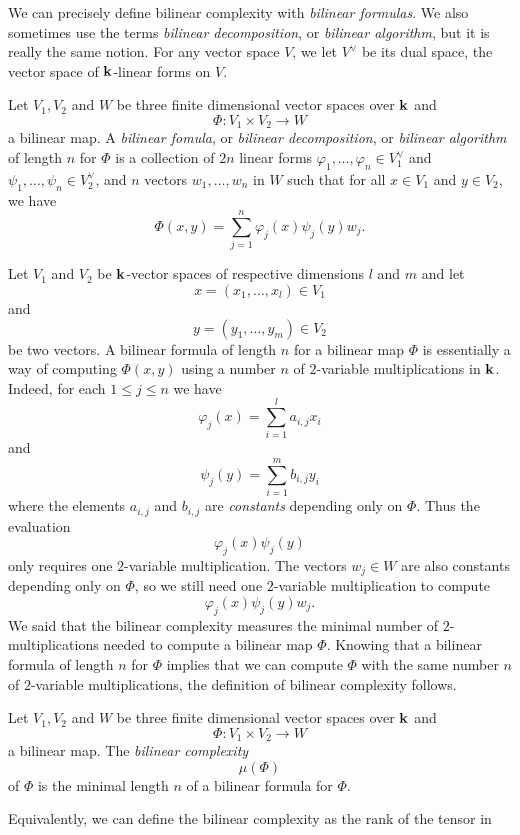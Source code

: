 We can precisely define bilinear complexity with \emph{bilinear formulas}. We
also sometimes use the terms \emph{bilinear decomposition}, or \emph{bilinear
algorithm}, but it is really the same notion. For any vector space $V$, we let
$V^\vee$ be its dual space, \ie the vector space of $\mathbf{k}$-linear forms on $V$.
\begin{defi}
  \label{defi:bilinear-formula}
  Let $V_1, V_2$ and $W$ be three finite dimensional vector spaces over $\mathbf{k}$ and 
  \[
    \Phi:V_1\times V_2\to W
  \]
  a bilinear map. A \emph{bilinear fomula}, or \emph{bilinear decomposition}, or
  \emph{bilinear algorithm} of length $n$ for $\Phi$ is a
  collection of $2n$ linear forms $\varphi_1, \dots, \varphi_n\in V_1^\vee$ and $\psi_1,
  \dots, \psi_n\in V_2^\vee$, and $n$ vectors $w_1, \dots, w_n$ in $W$ such that for all
  $x\in V_1$ and $y\in V_2$, we have
  \[
    \Phi(x, y) = \sum_{j=1}^n \varphi_j(x)\psi_j(y)w_j.
  \]
\end{defi}
Let $V_1$ and $V_2$ be $\mathbf{k}$-vector spaces of respective dimensions $l$ and $m$
and let
\[
  x = (x_1, \dots, x_l)\in V_1
\]
and
\[
  y = (y_1, \dots, y_m)\in V_2
\]
be two vectors.
A bilinear formula of length $n$ for a bilinear map $\Phi$ is essentially a way
of computing $\Phi(x, y)$ using a number $n$ of $2$-variable multiplications in $\mathbf{k}$.
Indeed, for each $1\leq j \leq n$ we have
\[
  \varphi_j(x) = \sum_{i=1}^l a_{i, j}x_i
\]
and
\[
  \psi_j(y) = \sum_{i=1}^m b_{i, j}y_i
\]
where the elements $a_{i, j}$ and $b_{i, j}$ are \emph{constants} depending only
on $\Phi$. Thus the evaluation
\[
  \varphi_j(x)\psi_j(y)
\]
only requires one $2$-variable multiplication. The vectors $w_j\in W$ are also
constants depending only on $\Phi$, so we still need one $2$-variable
multiplication to compute 
\[
  \varphi_j(x)\psi_j(y)w_j.
\]
We said that the bilinear complexity measures the minimal number of
$2$-multiplications needed to compute a bilinear map $\Phi$. Knowing that a
bilinear formula of length $n$ for $\Phi$ implies that we can compute $\Phi$
with the same number $n$ of $2$-variable multiplications, the definition of
bilinear complexity follows.
\begin{defi}
  Let $V_1, V_2$ and $W$ be three finite dimensional vector spaces over $\mathbf{k}$ and 
  \[
    \Phi:V_1\times V_2\to W
  \]
  a bilinear map. The \emph{bilinear complexity} 
  \[
    \mu(\Phi)
  \]
  of $\Phi$ is the minimal length $n$ of a bilinear formula for $\Phi$.
\end{defi}
Equivalently, we can define the bilinear complexity as the rank of the tensor in 
